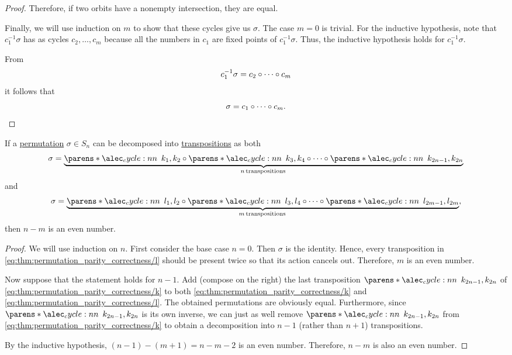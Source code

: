 \begin{proof}
  Therefore, if two orbits have a nonempty intersection, they are equal.

  Finally, we will use induction on \( m \) to show that these cycles give us \( \sigma \). The case \( m = 0 \) is trivial. For the inductive hypothesis, note that \( c_1^{-1} \sigma \) has as cycles \( c_2, \ldots, c_m \) because all the numbers in \( c_1 \) are fixed points of \( c_1^{-1} \sigma \). Thus, the inductive hypothesis holds for \( c_1^{-1} \sigma \).

  From
  \begin{equation*}
    c_1^{-1} \sigma = c_2 \bincirc \cdots \bincirc c_m
  \end{equation*}
  it follows that
  \begin{equation*}
    \sigma = c_1 \bincirc \cdots \bincirc c_m.
  \end{equation*}
\end{proof}

\begin{lemma}\label{thm:permutation_parity_correctness}
  If a \hyperref[def:symmetric_group/permutation]{permutation} \( \sigma \in S_n \) can be decomposed into \hyperref[def:symmetric_group/cycle]{transpositions} as both
  \begin{equation}\label{eq:thm:permutation_parity_correctness/k}
    \sigma = \underbrace{\cycle{ k_1, k_2 } \bincirc \cycle{ k_3, k_4 } \bincirc \cdots \bincirc \cycle{ k_{2n-1}, k_{2n} }}_{n \T*{transpositions}}
  \end{equation}
  and
  \begin{equation}\label{eq:thm:permutation_parity_correctness/l}
    \sigma = \underbrace{\cycle{ l_1, l_2 } \bincirc \cycle{ l_3, l_4 } \bincirc \cdots \bincirc \cycle{ l_{2m-1}, l_{2m} }}_{m \T*{transpositions}},
  \end{equation}
  then \( n - m \) is an even number.
\end{lemma}
\begin{proof}
  We will use induction on \( n \). First consider the base case \( n = 0 \). Then \( \sigma \) is the identity. Hence, every transposition in \eqref{eq:thm:permutation_parity_correctness/l} should be present twice so that its action cancels out. Therefore, \( m \) is an even number.

  Now suppose that the statement holds for \( n - 1 \). Add (compose on the right) the last transposition \( \cycle{ k_{2n-1}, k_{2n} } \) of \eqref{eq:thm:permutation_parity_correctness/k} to both \eqref{eq:thm:permutation_parity_correctness/k} and \eqref{eq:thm:permutation_parity_correctness/l}. The obtained permutations are obviously equal. Furthermore, since \( \cycle{ k_{2n-1}, k_{2n} } \) is its own inverse, we can just as well remove \( \cycle{ k_{2n-1}, k_{2n} } \) from \eqref{eq:thm:permutation_parity_correctness/k} to obtain a decomposition into \( n - 1 \) (rather than \( n + 1 \)) transpositions.

  By the inductive hypothesis, \( (n - 1) - (m + 1) = n - m - 2 \) is an even number. Therefore, \( n - m \) is also an even number.
\end{proof}

